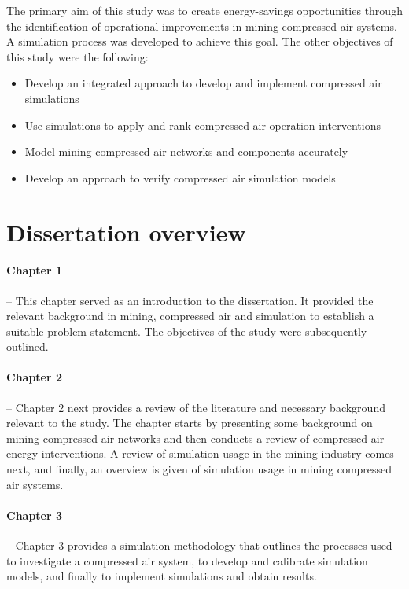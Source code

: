 		The primary aim of this study was to create energy-savings opportunities through the identification of operational improvements in mining compressed air systems. A simulation process was developed to achieve this goal. The other objectives of this study were the following:
		\begin{itemize}
			\item Develop an integrated approach to develop and implement compressed air simulations
			\item Use simulations to apply and rank compressed air operation interventions
			\item Model mining compressed air networks and components accurately
			\item Develop an approach to verify compressed air simulation models
		\end{itemize}
		
\section{Dissertation overview}
	\paragraph{Chapter 1} \hspace{0.4cm} -- This chapter served as an introduction to the dissertation. It provided the relevant background in mining, compressed air and simulation to establish a suitable problem statement. The objectives of the study were subsequently outlined.
	\paragraph{Chapter 2} \hspace{0.4cm} -- Chapter 2 next provides a review of the literature and necessary background relevant to the study. The chapter starts by presenting some background on mining compressed air networks and then conducts a review of compressed air energy interventions. A review of simulation usage in the mining industry comes next, and finally, an overview is given of simulation usage in mining compressed air systems.
	\paragraph{Chapter 3} \hspace{0.4cm} -- Chapter 3 provides a simulation methodology that outlines the processes used to investigate a compressed air system, to develop and calibrate simulation models, and finally to implement simulations and obtain results.
